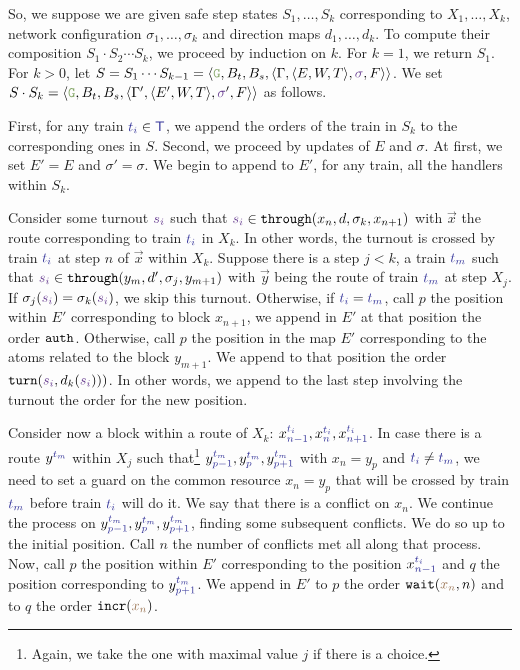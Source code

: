 \documentclass[runningheads]{llncs}
\newcommand{\throughS}{{\mathtt{through}}}
\newcommand{\posFmt}[1]{{\color{poscolor}{#1}}}
\newcommand{\swFmt}[1]{{\color{swcolor}{#1}}}
\newcommand{\sid}[1]{\ensuremath{\swFmt{s_{#1}}}}
\newcommand{\switches}{\ensuremath{\swFmt{\sigma}}}
\newcommand{\trainFmt}[1]{{\color{traincolor} #1}}
\newcommand{\trains}{{\trainFmt{\mathsf{T}}}}
\newcommand{\tid}[1]{\ensuremath{\trainFmt{t_{#1}}}}
\newcommand{\incr}[1]{{\mbox{\ensuremath{\mathtt{incr}(\posFmt{#1})}}}\xspace}
\newcommand{\turn}[2]{{\mbox{\ensuremath{\mathtt{turn}(#1, #2)}}}\xspace}
\newcommand{\auth}{{\mbox{\ensuremath{\mathtt{auth}}}}\xspace}
\newcommand{\wait}[2]{{\mbox{\ensuremath{\mathtt{wait}(\posFmt{#1}, #2)}}}\xspace}
\newcommand{\signals}{\ensuremath{F}}
\newcommand{\guardFmt}[1]{{\color{guardcolor} \ensuremath{\mathtt{#1}}}}
\newcommand{\guardG}{\guardFmt{G}}
\newcommand{\bufferFmt}[1]{#1}
\newcommand{\bufTrain}{\ensuremath{\bufferFmt{B_t}}\xspace}
\newcommand{\bufSig}{\ensuremath{\bufferFmt{B_s}}\xspace}
\begin{document}
So, we suppose we are given safe step states $S_1, \ldots, S_k$ corresponding to $X_1, \ldots, X_k$, network configuration $\sigma_1, \ldots, \sigma_k$ and direction maps $d_1, \ldots, d_k$. To compute their composition $S_1 \cdot S_2 \cdots S_k$, we proceed by induction on $k$. For $k = 1$, we return $S_1$. For $k>0$, let $S = S_1 \cdots S_{k-1}  = \langle \guardG, \bufTrain, \bufSig, \langle \Gamma, \langle E, W, T\rangle, \switches, \signals\rangle \rangle$. We set $S \cdot S_k = \langle \guardG, \bufTrain, \bufSig, \langle \Gamma', \langle E', W, T\rangle, \switches', \signals\rangle \rangle$ as follows. 

First,  for any train $\tid{i} \in \trains$, we append the orders of the train in $S_k$ to the corresponding ones in $S$. %
Second, we proceed by updates of $E$ and $\sigma$. At first, we set $E' = E$ and $\sigma' = \sigma$. We begin to append to $E'$, for any train, all the handlers within $S_k$.

Consider some turnout $\sid{i}$ such that $\sid{i} \in \throughS(x_n, d, \sigma_k, x_{n+1})$ with $\vec{x}$ the route corresponding to train $\tid{i}$ in $X_k$. In other words, the turnout is crossed by train $\tid{i}$ at step $n$ of $\vec{x}$ within $X_k$. Suppose there is a step $j < k$, a train $\tid{m}$ such that $\sid{i} \in \throughS(y_m, d', \sigma_j, y_{m+1})$ with $\vec{y}$ being the route of train $\tid{m}$ at step $X_j$. If $\sigma_j(\sid{i}) = \sigma_k(\sid{i})$, we skip this turnout. Otherwise, if $\tid{i} = \tid{m}$, call $p$ the position within $E'$ corresponding to block $x_{n+1}$, we append in $E'$ at that position the order $\auth$. Otherwise, call $p$ the position in the map $E'$ corresponding to the atoms related to the block $y_{m+1}$. We append to that position the order $\turn{\sid{i}}{d_k(\sid{i})})$. In other words, we append to the last step involving the turnout the order for the new position. 

Consider now a block within a route of $X_k$: $x_{n-1}^\tid{i}, x_n^\tid{i}, x_{n+1}^\tid{i}$. In case there is a route $y^\tid{m}$ within  $X_j$ such that\footnote{Again, we take the one with maximal value $j$ if there is a choice.} $y_{p-1}^\tid{m}, y_p^\tid{m}, y_{p+1}^\tid{m}$ with $x_n = y_p$ and $\tid{i} \neq \tid{m}$, we need to set a guard on the common resource $x_n = y_p$ that will be crossed by train $\tid{m}$ before train $\tid{i}$ will do it. We say that there is a conflict on $x_n$. We continue the process on $y_{p-1}^\tid{m}, y_p^\tid{m}, y_{p+1}^\tid{m}$, finding some subsequent conflicts. We do so up to the initial position. Call $n$ the number of conflicts met all along that process. Now, call $p$ the position within $E'$ corresponding to the position $x_{n-1}^\tid{i}$ and $q$ the position corresponding to $y_{p+1}^\tid{m}$. We append in $E'$ to $p$ the order $\wait{x_n}{n}$ and to $q$ the order $\incr{x_n}$.
\end{document}

